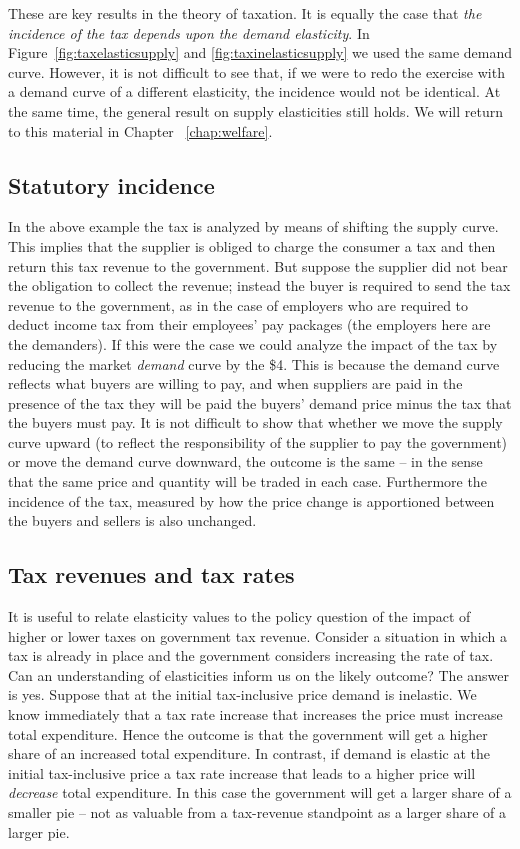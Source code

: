 These are key results in the theory of taxation. It is equally the case that 
\textit{the incidence of the tax depends upon the demand elasticity}. In
Figure~\ref{fig:taxelasticsupply} and \ref{fig:taxinelasticsupply} we used
the same demand curve. However, it is not difficult to see that, if we were
to redo the exercise with a demand curve of a different elasticity, the
incidence would not be identical. At the same time, the general result on
supply elasticities still holds. We will return to this material in Chapter~%
\ref{chap:welfare}.

\newhtmlpage

\subsection*{Statutory incidence}

In the above example the tax is analyzed by means of shifting the supply
curve. This implies that the supplier is obliged to charge the consumer a
tax and then return this tax revenue to the government. But suppose the
supplier did not bear the obligation to collect the revenue; instead the
buyer is required to send the tax revenue to the government, as in the case
of employers who are required to deduct income tax from their employees' pay
packages (the employers here are the demanders). If this were
the case we could analyze the impact of the tax by reducing the market 
\textit{demand} curve by the \$4. This is because the demand curve
reflects what buyers are willing to pay, and when suppliers are paid in
the presence of the tax they will be paid the buyers' demand price minus the
tax that the buyers must pay. It is not difficult to show that whether we
move the supply curve upward (to reflect the responsibility of the supplier
to pay the government) or move the demand curve downward, the outcome is the
same -- in the sense that the same price and quantity will be traded in each
case. Furthermore the incidence of the tax, measured by how the price change
is apportioned between the buyers and sellers is also unchanged.

\subsection*{Tax revenues and tax rates}

It is useful to relate elasticity values to the policy question of the
impact of higher or lower taxes on government tax revenue. Consider a
situation in which a tax is already in place and the government considers
increasing the rate of tax. Can an understanding of elasticities inform us
on the likely outcome? The answer is yes. Suppose that at the initial 
tax-inclusive price demand is inelastic. We know immediately that a tax rate
increase that increases the price must increase total expenditure. Hence the
outcome is that the government will get a higher share of an increased total
expenditure. In contrast, if demand is elastic at the initial tax-inclusive
price a tax rate increase that leads to a higher price will \textit{decrease}
total expenditure. In this case the government will get a larger share of a
smaller pie -- not as valuable from a tax-revenue standpoint as a larger
share of a larger pie.